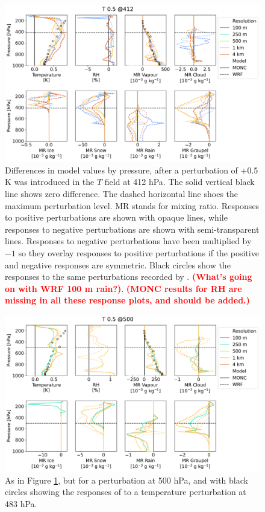 \documentclass[draft]{agujournal2019}
\newcommand{\todo}[1]{\textcolor{red}{\textbf{(#1)}}}
\begin{document}
\begin{figure}[pth]
    \noindent\includegraphics[width=\textwidth]{figures/pert_diffs_T_0.5_@412}
    \caption{Differences in model values by pressure, after a perturbation of
    +0.5 K was introduced in the $T$ field at 412 hPa. The solid vertical black
    line shows zero difference. The dashed horizontal line shoes the maximum
    perturbation level. MR stands for mixing ratio. Responses to positive
    perturbations are shown with opaque lines, while responses to negative
    perturbations are shown with semi-transparent lines. Responses to negative
    perturbations have been multiplied by $-1$ so they overlay responses to
    positive perturbations if the positive and negative responses are symmetric.
    Black circles show the responses to the same perturbations recorded by
    . \todo{What's going on with WRF 100 m rain?}.
    \todo{MONC results for RH are missing in all these response plots, and
    should be added.}}
    \label{fig:tpert_412}
\end{figure}

\begin{figure}[pth]
    \noindent\includegraphics[width=\textwidth]{figures/pert_diffs_T_0.5_@500}
    \caption{As in Figure \ref{fig:tpert_412}, but for a perturbation at 500
    hPa, and with black circles showing the responses of 
    to a temperature perturbation at 483 hPa.}
    \label{fig:tpert_500}
\end{figure}
\end{document}
